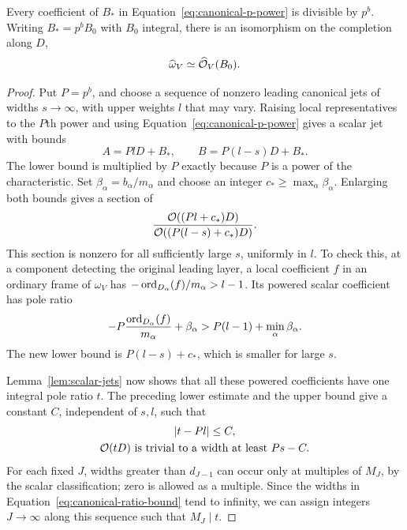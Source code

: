 \begin{proposition}\label{prop:canonical-formal-root}
Every coefficient of $B_*$ in
Equation~\ref{eq:canonical-p-power} is divisible by $p^b$.
Writing $B_*=p^bB_0$ with $B_0$ integral, there is an
isomorphism on the completion along $D$,
\begin{equation}\label{eq:canonical-formal-root}
 \widehat{\omega}_V\simeq\widehat{\mathcal O}_V(B_0).
\end{equation}
\end{proposition}

\begin{proof}
Put $P=p^b$, and choose a sequence of nonzero leading
canonical jets of widths $s\to\infty$, with upper weights
$l$ that may vary. Raising local representatives to the
$P$th power and using Equation~\ref{eq:canonical-p-power}
gives a scalar jet with bounds
\[
 A=PlD+B_*,\qquad B=P(l-s)D+B_*.
\]
The lower bound is multiplied by $P$ exactly because $P$
is a power of the characteristic. Set
$\beta_\alpha=b_\alpha/m_\alpha$ and choose an integer
$c_*\geq\max_\alpha\beta_\alpha$. Enlarging both bounds
gives a section of
\[
 \frac{\mathcal O((Pl+c_*)D)}{\mathcal O((P(l-s)+c_*)D)}.
\]
This section is nonzero for all sufficiently large $s$,
uniformly in $l$. To check this, at a component detecting
the original leading layer, a local coefficient $f$ in
an ordinary frame of $\omega_V$ has
$-\operatorname{ord}_{D_\alpha}(f)/m_\alpha>l-1$. Its powered scalar
coefficient has pole ratio
\[
 -P\frac{\operatorname{ord}_{D_\alpha}(f)}{m_\alpha}
       +\beta_\alpha>P(l-1)+\min_\alpha\beta_\alpha.
\]
The new lower bound is $P(l-s)+c_*$, which is smaller for
large $s$.

Lemma~\ref{lem:scalar-jets} now shows that all these powered
coefficients have one integral pole ratio $t$. The preceding
lower estimate and the upper bound give a constant $C$, independent
of $s,l$, such that
\begin{equation}\label{eq:canonical-ratio-bound}
 \begin{gathered}
 |t-Pl|\leq C,\\
 \mathcal O(tD)\text{ is trivial to a width at least }Ps-C.
 \end{gathered}
\end{equation}
For each fixed $J$, widths greater than $d_{J-1}$ can occur
only at multiples of $M_J$, by the scalar classification;
zero is allowed as a multiple. Since the widths in
Equation~\ref{eq:canonical-ratio-bound} tend to infinity,
we can assign integers $J\to\infty$ along this sequence
such that $M_J\mid t$.


\end{proof}
